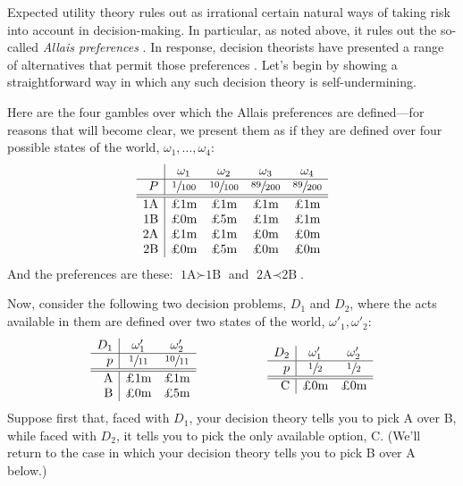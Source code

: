\documentclass[a4paper]{article}
\newenvironment{CCM rewritten}
{\begingroup\color{blue}} %
{\endgroup}              %
\begin{document}
Expected utility theory rules out as irrational certain natural ways of taking risk into account in decision-making. In particular, as noted above, it rules out the so-called \emph{Allais preferences} \citep{allais1953c}. In response, decision theorists have presented a range of alternatives that permit those preferences \citep{kahneman1979pt,machina1982eua,quiggin1982tau, buchak2014rr}. Let's begin by showing a straightforward way in which any such decision theory is self-undermining.

Here are the four gambles over which the Allais preferences are defined---for reasons that will become clear, we present them as if they are defined over four possible states of the world, $\omega_1, \ldots, \omega_4$:
$$
\begin{array}{r|cccc}
& \omega_1 & \omega_2 & \omega_3 & \omega_4 \\
\hline
P & \sfrac{1}{100} & \sfrac{10}{100} & \sfrac{89}{200} & \sfrac{89}{200} \\
\hline
\hline
\text{1A} & \text{\pounds 1m} & \text{\pounds 1m}  & \text{\pounds 1m} & \text{\pounds 1m}  \\
\text{1B} & \text{\pounds 0m} & \text{\pounds 5m}  & \text{\pounds 1m}& \text{\pounds 1m}  \\
\text{2A} & \text{\pounds 1m} & \text{\pounds 1m}  & \text{\pounds 0m}  & \text{\pounds 0m}  \\
\text{2B} & \text{\pounds 0m} & \text{\pounds 5m}  & \text{\pounds 0m}  & \text{\pounds 0m}  
\end{array}
$$
And the preferences are these: $\text{1A} \succ \text{1B}$ and $\text{2A} \prec \text{2B}$. 

Now, consider the following two decision problems, $D_1$ and $D_2$, where the acts available in them are defined over two states of the world, $\omega'_1, \omega'_2$:
$$
\begin{array}{r|cc}
D_1 & \omega'_1 & \omega'_2  \\
\hline
p & \sfrac{1}{11} & \sfrac{10}{11} \\
\hline
\hline
\text{A} & \text{\pounds 1m} & \text{\pounds 1m}   \\
\text{B} & \text{\pounds 0m} & \text{\pounds 5m} 
\end{array}\hspace{20mm}
\begin{array}{r|cc}
D_2 & \omega'_1 & \omega'_2  \\
\hline
p & \sfrac{1}{2} & \sfrac{1}{2} \\
\hline
\hline
\text{C} & \text{\pounds 0m} & \text{\pounds 0m} 
\end{array}
$$
Suppose first that, faced with $D_1$, your decision theory tells you to pick A over B, while faced with $D_2$, it tells you to pick the only available option, C. (We'll return to the case in which your decision theory tells you to pick B over A below.)
\end{document}
